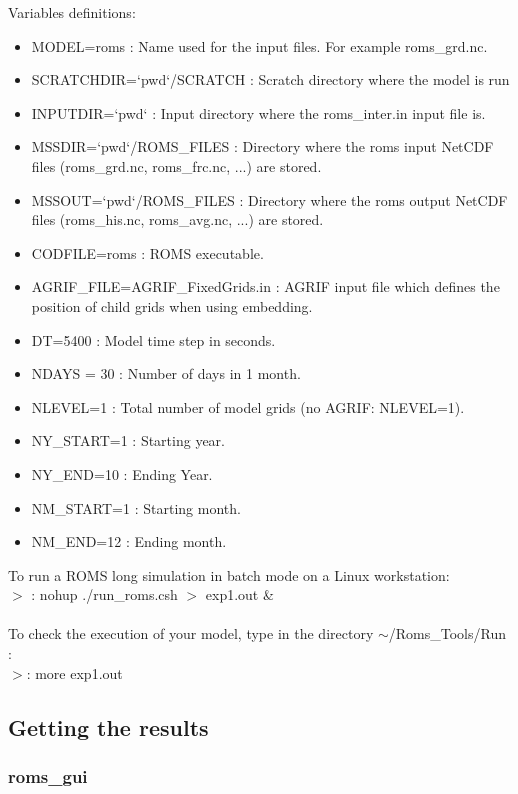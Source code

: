 Variables definitions:
\begin{itemize}
\item MODEL=roms : Name used for the input files. For example roms\_grd.nc.
\item SCRATCHDIR=`pwd`/SCRATCH : Scratch directory where the model is run
\item INPUTDIR=`pwd` : Input directory where the roms\_inter.in input file
is.
\item MSSDIR=`pwd`/ROMS\_FILES : Directory where the roms input NetCDF files
(roms\_grd.nc, roms\_frc.nc, ...) are stored.
\item MSSOUT=`pwd`/ROMS\_FILES : Directory where the roms output NetCDF files
(roms\_his.nc, roms\_avg.nc, ...) are stored.
\item CODFILE=roms : ROMS executable.
\item AGRIF\_FILE=AGRIF\_FixedGrids.in : AGRIF input file which defines the 
position of child grids when using embedding.
\item DT=5400 : Model time step in seconds.
\item NDAYS = 30 : Number of days in 1 month.
\item NLEVEL=1 : Total number of model grids (no AGRIF: NLEVEL=1).
\item NY\_START=1 : Starting year.
\item NY\_END=10 : Ending Year.
\item NM\_START=1 : Starting month.
\item NM\_END=12 : Ending month.
\end{itemize}

To run a ROMS long simulation in batch mode on a Linux workstation:\\	

$>$ : nohup ./run\_roms.csh $>$ exp1.out \&\\\\
To check the execution of your model, type in the directory
$\sim$/Roms\_Tools/Run :\\ $>$: more exp1.out
\subsection{Getting the results}

\subsubsection{roms\_gui}

